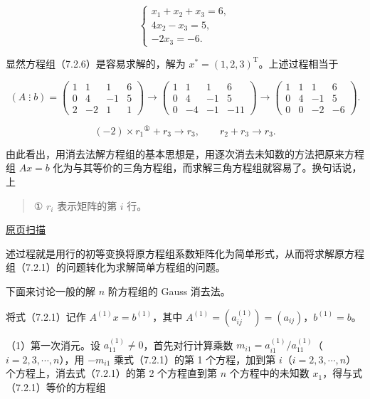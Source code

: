 \documentclass[
  10pt,
  fontset=fandol]{ctexart}
\begin{document}
\[
\begin{cases}
x_1+x_2+x_3=6,\\
4x_2-x_3=5,\\
-2x_3=-6.
\end{cases}
\tag{7.2.6}
\]

显然方程组（7.2.6）是容易求解的，解为 \(x^*=(1,2,3)^{\mathrm T}\)。上述过程相当于

\[
(A\mathbin{\vdots}b)=
\left(\begin{array}{rrr|r}1&1&1&6\\0&4&-1&5\\2&-2&1&1\end{array}\right)
\longrightarrow
\left(\begin{array}{rrr|r}1&1&1&6\\0&4&-1&5\\0&-4&-1&-11\end{array}\right)
\longrightarrow
\left(\begin{array}{rrr|r}1&1&1&6\\0&4&-1&5\\0&0&-2&-6\end{array}\right).
\]

\[(-2)\times r_1{}^{\text{①}}+r_3\to r_3,\qquad r_2+r_3\to r_3.\]

由此看出，用消去法解方程组的基本思想是，用逐次消去未知数的方法把原来方程组 \(Ax=b\) 化为与其等价的三角方程组，而求解三角方程组就容易了。换句话说，上

\begin{quote}
① \(r_i\) 表示矩阵的第 \(i\) 行。
\end{quote}

\href{../../source-images/pdf-179.jpeg}{原页扫描}

述过程就是用行的初等变换将原方程组系数矩阵化为简单形式，从而将求解原方程组（7.2.1）的问题转化为求解简单方程组的问题。

下面来讨论一般的解 \(n\) 阶方程组的 Gauss 消去法。

将式（7.2.1）记作 \(A^{(1)}x=b^{(1)}\)，其中 \(A^{(1)}=(a_{ij}^{(1)})=(a_{ij})\)，\(b^{(1)}=b\)。

（1）第一次消元。设 \(a_{11}^{(1)}\ne0\)，首先对行计算乘数 \(m_{i1}=a_{i1}^{(1)}/a_{11}^{(1)}\)（\(i=2,3,\cdots,n\)），用 \(-m_{i1}\) 乘式（7.2.1）的第 1 个方程，加到第 \(i\)（\(i=2,3,\cdots,n\)）个方程上，消去式（7.2.1）的第 2 个方程直到第 \(n\) 个方程中的未知数 \(x_1\)，得与式（7.2.1）等价的方程组
\end{document}
